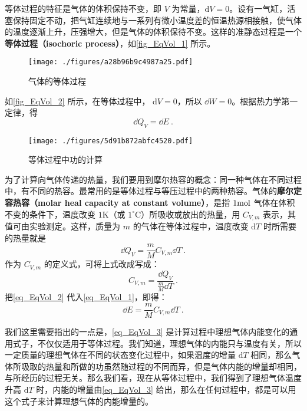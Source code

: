 

等体过程的特征是气体的体积保持不变，即 $V $ 为常量，$\mathrm dV=0$。设有一气缸，活塞保持固定不动，把气缸连续地与一系列有微小温度差的恒温热源相接触，使气体的温度逐渐上升，压强增大，但是气体的体积保待不变。这样的准静态过程是一个\textbf{等体过程（isochoric process）}，如\autoref{fig_EqVol_1} 所示。
\begin{figure}[ht]
\centering
\texttt{[image: ./figures/a28b96b9c4987a25.pdf]}
\caption{气体的等体过程} \label{fig_EqVol_1}
\end{figure}
如\autoref{fig_EqVol_2} 所示，在等体过程中， $\mathrm dV=0$，所以 $\dd W=0$。根据热力学第一定律，得
\begin{equation} \label{eq_EqVol_1}
\dd Q_{V}=\dd E ~.
\end{equation}
\begin{figure}[ht]
\centering
\texttt{[image: ./figures/5d91b872abfc4520.pdf]}
\caption{等体过程中功的计算} \label{fig_EqVol_2}
\end{figure}
为了计算向气体传递的热量，我们要用到摩尔热容的概念：同一种气体在不同过程中，有不同的热容。最常用的是等体过程与等压过程中的两种热容。气体的\textbf{摩尔定容热容（molar heal capacity at constant volume）}，是指 $1 \rm mol$ 气体在体积不变的条件下，温度改变 $1\mathrm{K}$（或 $1^\circ \mathrm{C}$）所吸收或放出的热量，用 $C_{V,m}$ 表示，其值可由实验测定。这样，质量为 $m $ 的气体在等体过程中，温度改变 $\mathrm dT $ 时所需要的热量就是
\begin{equation} \label{eq_EqVol_2}
\dd Q_{V}=\frac{m}{M} C_{V, {m}} \dd T~.
\end{equation}
作为 $C_{V,m}$ 的定义式，可将上式改成写成：
\begin{equation} 
C_{V, m}=\frac{\dd Q_{V}}{\frac{m}{M} \dd T}~.
\end{equation}
把\autoref{eq_EqVol_2} 代入\autoref{eq_EqVol_1}，即得：
\begin{equation} \label{eq_EqVol_3}
\dd E=\frac{m}{M} C_{V, m} \dd T~.
\end{equation}

我们这里需要指出的一点是，\autoref{eq_EqVol_3} 是计算过程中理想气体内能变化的通用式子，不仅仅适用于等体过程。我们知道，理想气体的内能只与温度有关，所以一定质量的理想气体在不同的状态变化过程中，如果温度的增量 $\mathrm dT $ 相同，那么气体所吸取的热量和所做的功虽然随过程的不同而异，但是气体内能的增量却相同，与所经历的过程无关。那么我们看，现在从等体过程中，我们得到了理想气体温度升高 $\mathrm dT $ 时，内能的增量由\autoref{eq_EqVol_3} 给出，那么在任何过程中，都是可以用这个式子来计算理想气体的内能增量的。

